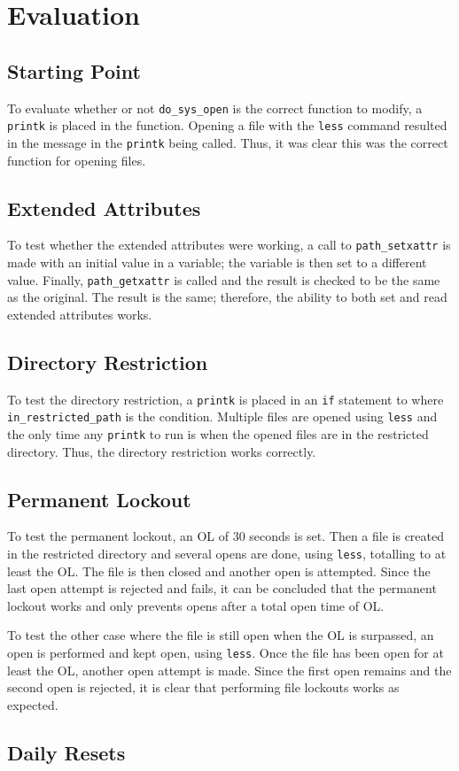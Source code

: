 \section{Evaluation}

\subsection*{Starting Point}

To evaluate whether or not \texttt{do\_sys\_open} is the correct function to modify, a \texttt{printk} is placed in the function. Opening a file with the \texttt{less} command resulted in the message in the \texttt{printk} being called. Thus, it was clear this was the correct function for opening files.

\subsection*{Extended Attributes}

To test whether the extended attributes were working, a call to \texttt{path\_setxattr} is made with an initial value in a variable; the variable is then set to a different value. Finally, \texttt{path\_getxattr} is called and the result is checked to be the same as the original. The result is the same; therefore, the ability to both set and read extended attributes works.

\subsection*{Directory Restriction}

To test the directory restriction, a \texttt{printk} is placed in an \texttt{if} statement to where \texttt{in\_restricted\_path} is the condition. Multiple files are opened using \texttt{less} and the only time any \texttt{printk} to run is when the opened files are in the restricted directory. Thus, the directory restriction works correctly.

\subsection*{Permanent Lockout}

To test the permanent lockout, an OL of 30 seconds is set. Then a file is created in the restricted directory and several opens are done, using \texttt{less}, totalling to at least the OL. The file is then closed and another open is attempted. Since the last open attempt is rejected and fails, it can be concluded that the permanent lockout works and only prevents opens after a total open time of OL.

To test the other case where the file is still open when the OL is surpassed, an open is performed and kept open, using \texttt{less}. Once the file has been open for at least the OL, another open attempt is made. Since the first open remains and the second open is rejected, it is clear that performing file lockouts works as expected.

\subsection*{Daily Resets}

